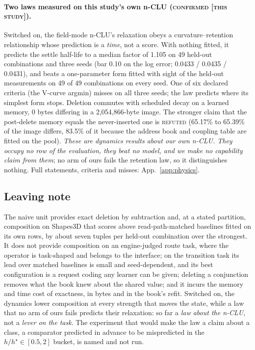 \documentclass{article} %
\begin{document}
\paragraph{Two laws measured on this study's own n-CLU (\textsc{confirmed [this study]}).}
Switched on, the field-mode n-CLU's relaxation obeys a curvature--retention relationship whose
prediction is a \emph{time}, not a score. With nothing fitted, it predicts the settle half-life to
a median factor of 1.105 on 49 held-out combinations and three seeds (bar 0.10 on the log error; 0.0433
/ 0.0435 / 0.0431), and beats a one-parameter form fitted with sight of the held-out
measurements on 49 of 49 combinations on every seed. One of six declared criteria (the V-curve
argmin) misses on all three seeds; the law predicts where its simplest form stops.
Deletion commutes with scheduled decay on a learned memory, 0 bytes differing in a
2,054,866-byte image. The stronger claim that the post-delete memory equals the never-inserted one is \textsc{refuted} (65.17\% to 65.39\% of the image differs, 83.5\% of it because the
address book and coupling table are fitted on the pool). %
\emph{These are dynamics results about our own n-CLU. They occupy no row of the evaluation, they
beat no model, and we make no capability claim from them}; no arm of ours fails the retention law, so it distinguishes nothing. Full statements, criteria and misses: App.~\ref{app:physics}.

\subsection{Leaving note}
\label{sec:leaving}

The naive unit provides exact deletion by subtraction and, at a stated partition, composition on
Shapes3D that scores above read-path-matched baselines fitted on its own rows, by about seven tuples per
held-out combination over the strongest. It does not provide composition on an engine-judged route task, where the
operator is task-shaped and belongs to the interface; on the transition task its lead over matched
baselines is small and seed-dependent, and its best configuration is a request coding any learner can be
given; deleting a conjunction removes what the book knew about the shared value; and it incurs the
memory and time cost of exactness, in bytes and in the book's refit. Switched on, the dynamics lower composition at
every strength that moves the state, while a law that no arm of ours fails predicts their relaxation:
so far a \emph{law about the n-CLU}, not a \emph{lever on the task}. The experiment that would make
the law a claim about a class, a comparator predicted in advance to be mispredicted in the
$h/h^\star\in[0.5,2]$ bucket, is named and not run. %
\end{document}
